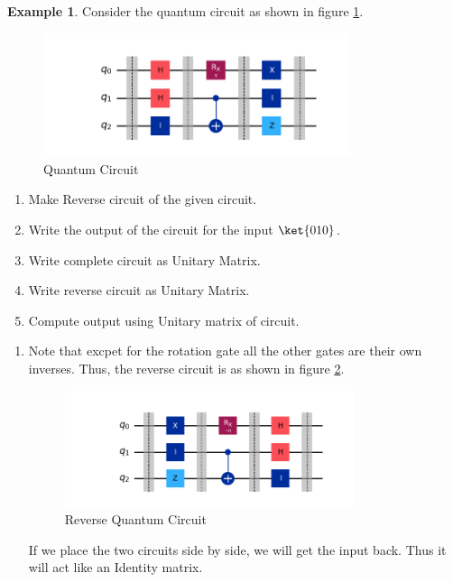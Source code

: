\documentclass[12pt, oneside]{book}
\theoremstyle{definition}
\theoremstyle{definition}
\newtheorem{example}{Example}[section]
\theoremstyle{remark}
\begin{document}
\begin{example}
    Consider the quantum circuit as shown in figure \ref{fig:qcircuit1}.
    \begin{figure}[H]
        \centering
        \includegraphics[width=0.8\textwidth]{../images/qcircuit1.png}
        \caption{Quantum Circuit}
        \label{fig:qcircuit1}
    \end{figure}
    \begin{enumerate}
        \item Make Reverse circuit of the given circuit.
        \item Write the output of the circuit for the input $\ket{010}$.
        \item Write complete circuit as Unitary Matrix.
        \item Write reverse circuit as Unitary Matrix.
        \item Compute output using Unitary matrix of circuit.
    \end{enumerate}
    \begin{enumerate}
        \item Note that excpet for the rotation gate all the other gates are their own inverses. Thus, the reverse circuit is as shown in figure \ref{fig:qcircuit1-rev}.
        \begin{figure}[H]
            \centering
            \includegraphics[width=0.8\textwidth]{../images/qcircuit1-rev.png}
            \caption{Reverse Quantum Circuit}
            \label{fig:qcircuit1-rev}
        \end{figure}
        If we place the two circuits side by side, we will get the input back. Thus it will act like an Identity matrix.

\end{enumerate}
\end{example}
\end{document}
